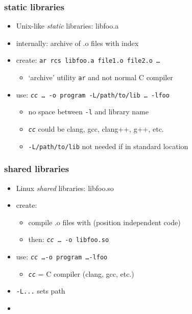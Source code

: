 \begin{frame}\frametitle{static libraries}
    \begin{itemize}
    \item Unix-like \textit{static} libraries: libfoo.a
    \item internally: archive of .o files with index
    \item create: \texttt{ar rcs libfoo.a file1.o file2.o \ldots}
        \begin{itemize}
        \item `archive' utility \texttt{ar} and not normal C compiler
        \end{itemize}
    \item use: \texttt{\textit{cc} \ldots~-o program -L/path/to/lib \ldots~-lfoo}
        \begin{itemize}
        \item no space between \texttt{-l} and library name
        \item \texttt{\textit{cc}} could be clang, gcc, clang++, g++, etc.
        \item \texttt{-L/path/to/lib} not needed if in standard location
        \end{itemize}
    \end{itemize}
\end{frame}

\begin{frame}\frametitle{shared libraries}
    \begin{itemize}
    \item Linux \textit{shared} libraries: libfoo.so
    \item create:
        \begin{itemize}
        \item compile .o files with  (position independent code)
        \item then: \texttt{\textit{cc}  \ldots~-o libfoo.so}
        \end{itemize}
    \item use: \texttt{\textit{cc} \ldots -o program  \ldots -lfoo}
        \begin{itemize}
        \item \texttt{\textit{cc}} = C compiler (clang, gcc, etc.)
        \end{itemize}
    \vspace{.5cm}
    \item<2-> \texttt{-L...} sets path \textit{}
    \item<2-> 
    \end{itemize}
\end{frame}
